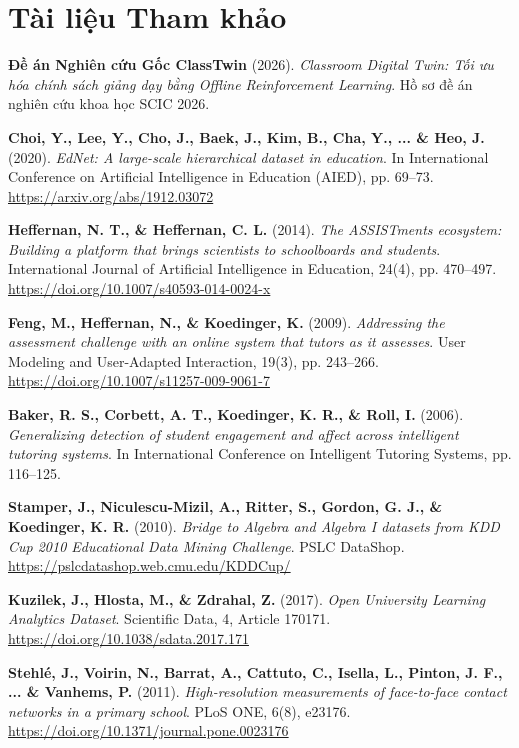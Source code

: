 \section{Tài liệu Tham khảo}\label{sec:tai-lieu-tham-khao}

\begin{enumerate}[label={[\arabic*]}]
  \item \textbf{Đề án Nghiên cứu Gốc ClassTwin} (2026). \textit{Classroom Digital Twin: Tối ưu hóa chính sách giảng dạy bằng Offline Reinforcement Learning}. Hồ sơ đề án nghiên cứu khoa học SCIC 2026.
  \item \textbf{Choi, Y., Lee, Y., Cho, J., Baek, J., Kim, B., Cha, Y., ... \& Heo, J.} (2020). \textit{EdNet: A large-scale hierarchical dataset in education}. In International Conference on Artificial Intelligence in Education (AIED), pp. 69--73. \url{https://arxiv.org/abs/1912.03072}
  \item \textbf{Heffernan, N. T., \& Heffernan, C. L.} (2014). \textit{The ASSISTments ecosystem: Building a platform that brings scientists to schoolboards and students}. International Journal of Artificial Intelligence in Education, 24(4), pp. 470--497. \url{https://doi.org/10.1007/s40593-014-0024-x}
  \item \textbf{Feng, M., Heffernan, N., \& Koedinger, K.} (2009). \textit{Addressing the assessment challenge with an online system that tutors as it assesses}. User Modeling and User-Adapted Interaction, 19(3), pp. 243--266. \url{https://doi.org/10.1007/s11257-009-9061-7}
  \item \textbf{Baker, R. S., Corbett, A. T., Koedinger, K. R., \& Roll, I.} (2006). \textit{Generalizing detection of student engagement and affect across intelligent tutoring systems}. In International Conference on Intelligent Tutoring Systems, pp. 116--125.
  \item \textbf{Stamper, J., Niculescu-Mizil, A., Ritter, S., Gordon, G. J., \& Koedinger, K. R.} (2010). \textit{Bridge to Algebra and Algebra I datasets from KDD Cup 2010 Educational Data Mining Challenge}. PSLC DataShop. \url{https://pslcdatashop.web.cmu.edu/KDDCup/}
  \item \textbf{Kuzilek, J., Hlosta, M., \& Zdrahal, Z.} (2017). \textit{Open University Learning Analytics Dataset}. Scientific Data, 4, Article 170171. \url{https://doi.org/10.1038/sdata.2017.171}
  \item \textbf{Stehlé, J., Voirin, N., Barrat, A., Cattuto, C., Isella, L., Pinton, J. F., ... \& Vanhems, P.} (2011). \textit{High-resolution measurements of face-to-face contact networks in a primary school}. PLoS ONE, 6(8), e23176. \url{https://doi.org/10.1371/journal.pone.0023176}

\end{enumerate}
